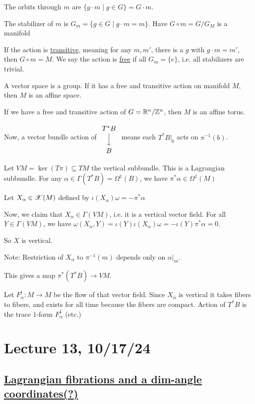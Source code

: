 \documentclass[x11names,reqno,14pt]{extarticle}
\newcommand{\fibrate}[3]{\begin{tikzcd} #1 \ar[d, "#2"] \\ #3 \end{tikzcd}}
\begin{document}
The orbits through $m$ are $\{g\cdot m\mid g \in G\} = G\cdot m$.

The stabilizer of $m$ is $G_m = \{g \in G \mid g\cdot m = m\}$. Have $G\circ m = G/G_M$ is a manifold 

If the action is \underline{transitive}, meaning for any $m, m'$, there is a $g$ with $g\cdot m = m'$, then $G\circ m = M$. We say the action is \underline{free} if all $G_m = \{e\}$, i.e. all stabilizers are trivial. 

A vector space is a group. If it has a free and transitive action on manifold $M$, then $M$ is an affine space.

If we have a free and transitive action of $G = \mathbb{R}^n/\mathbb{Z}^n$, then $M$ is an affine torus. 

Now, a vector bundle action of $\fibrate{T^*B}{}{B}$ means each $T^*B|_b$ acts on $\pi^{-1}(b)$.

\proof

Let $VM = \ker(T\pi) \subseteq TM$ the vertical subbundle. This is a Lagrangian subbundle. For any $\alpha\in\Gamma(T^*B) = \Omega^1(B)$, we have $\pi^*\alpha \in \Omega^1(M)$

Let $X_\alpha \in \mathscr{X}(M)$ defined by $\iota(X_\alpha)\omega = -\pi^*\alpha$

Now, we claim that $X_\alpha \in \Gamma(VM)$, i.e. it is a vertical vector field. For all $Y \in \Gamma(VM)$, we have $\omega(X_\alpha, Y) = \iota(Y)\iota(X_\alpha)\omega = -\iota(Y)\pi^*\alpha=0$. 

So $X$ is vertical. 

Note: Restriction of $X_\alpha$ to $\pi^{-1}(m)$ depends only on $\alpha|_m$. 

This gives a map $\pi^*(T^*B)\to VM$.

Let $F_\alpha^t:M\to M$ be the flow of that vector field. Since $X_\alpha$ is vertical it takes fibers to fibers, and exists for all time because the fibers are compact. Action of $T^*B$ is the trace $1$-form $F_\alpha^1$ (etc.)

\section*{Lecture 13, 10/17/24}

\subsection*{\underline{Lagrangian fibrations and a dim-angle coordinates(?)}}
\end{document}
